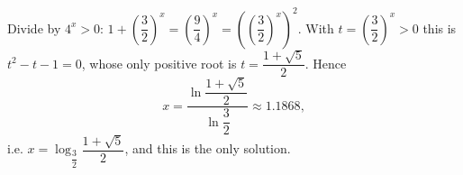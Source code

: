 Divide by $4^x>0$: $1+\left(\dfrac32\right)^x=\left(\dfrac94\right)^x=\left(\left(\dfrac32\right)^x\right)^2$. With $t=\left(\dfrac32\right)^x>0$ this is $t^2-t-1=0$, whose only positive root is $t=\dfrac{1+\sqrt5}2$. Hence
\[x=\boxed{\dfrac{\ln\dfrac{1+\sqrt5}{2}}{\ln\dfrac32}}\approx1.1868,\]
i.e. $x=\log_{\dfrac32}\dfrac{1+\sqrt5}2$, and this is the only solution.
